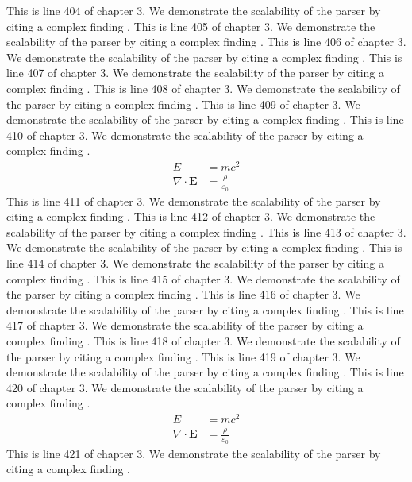 This is line 404 of chapter 3. We demonstrate the scalability of the parser by citing a complex finding \cite{ref3_404}.
This is line 405 of chapter 3. We demonstrate the scalability of the parser by citing a complex finding \cite{ref3_405}.
This is line 406 of chapter 3. We demonstrate the scalability of the parser by citing a complex finding \cite{ref3_406}.
This is line 407 of chapter 3. We demonstrate the scalability of the parser by citing a complex finding \cite{ref3_407}.
This is line 408 of chapter 3. We demonstrate the scalability of the parser by citing a complex finding \cite{ref3_408}.
This is line 409 of chapter 3. We demonstrate the scalability of the parser by citing a complex finding \cite{ref3_409}.
This is line 410 of chapter 3. We demonstrate the scalability of the parser by citing a complex finding \cite{ref3_410}.
\begin{align*}
  E &= mc^2 \\
  \nabla \cdot \mathbf{E} &= \frac{\rho}{\varepsilon_0}
\end{align*}
This is line 411 of chapter 3. We demonstrate the scalability of the parser by citing a complex finding \cite{ref3_411}.
This is line 412 of chapter 3. We demonstrate the scalability of the parser by citing a complex finding \cite{ref3_412}.
This is line 413 of chapter 3. We demonstrate the scalability of the parser by citing a complex finding \cite{ref3_413}.
This is line 414 of chapter 3. We demonstrate the scalability of the parser by citing a complex finding \cite{ref3_414}.
This is line 415 of chapter 3. We demonstrate the scalability of the parser by citing a complex finding \cite{ref3_415}.
This is line 416 of chapter 3. We demonstrate the scalability of the parser by citing a complex finding \cite{ref3_416}.
This is line 417 of chapter 3. We demonstrate the scalability of the parser by citing a complex finding \cite{ref3_417}.
This is line 418 of chapter 3. We demonstrate the scalability of the parser by citing a complex finding \cite{ref3_418}.
This is line 419 of chapter 3. We demonstrate the scalability of the parser by citing a complex finding \cite{ref3_419}.
This is line 420 of chapter 3. We demonstrate the scalability of the parser by citing a complex finding \cite{ref3_420}.
\begin{align*}
  E &= mc^2 \\
  \nabla \cdot \mathbf{E} &= \frac{\rho}{\varepsilon_0}
\end{align*}
This is line 421 of chapter 3. We demonstrate the scalability of the parser by citing a complex finding \cite{ref3_421}.
